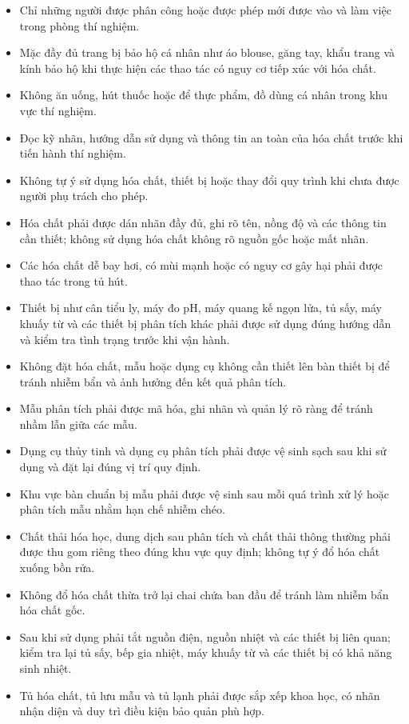 \begin{itemize}
  \item Chỉ những người được phân công hoặc được phép mới được vào và làm việc trong phòng thí nghiệm.
  \item Mặc đầy đủ trang bị bảo hộ cá nhân như áo blouse, găng tay, khẩu trang và kính bảo hộ khi thực hiện các thao tác có nguy cơ tiếp xúc với hóa chất.
  \item Không ăn uống, hút thuốc hoặc để thực phẩm, đồ dùng cá nhân trong khu vực thí nghiệm.
  \item Đọc kỹ nhãn, hướng dẫn sử dụng và thông tin an toàn của hóa chất trước khi tiến hành thí nghiệm.
  \item Không tự ý sử dụng hóa chất, thiết bị hoặc thay đổi quy trình khi chưa được người phụ trách cho phép.
  \item Hóa chất phải được dán nhãn đầy đủ, ghi rõ tên, nồng độ và các thông tin cần thiết; không sử dụng hóa chất không rõ nguồn gốc hoặc mất nhãn.
  \item Các hóa chất dễ bay hơi, có mùi mạnh hoặc có nguy cơ gây hại phải được thao tác trong tủ hút.
  \item Thiết bị như cân tiểu ly, máy đo pH, máy quang kế ngọn lửa, tủ sấy, máy khuấy từ và các thiết bị phân tích khác phải được sử dụng đúng hướng dẫn và kiểm tra tình trạng trước khi vận hành.
  \item Không đặt hóa chất, mẫu hoặc dụng cụ không cần thiết lên bàn thiết bị để tránh nhiễm bẩn và ảnh hưởng đến kết quả phân tích.
  \item Mẫu phân tích phải được mã hóa, ghi nhãn và quản lý rõ ràng để tránh nhầm lẫn giữa các mẫu.
  \item Dụng cụ thủy tinh và dụng cụ phân tích phải được vệ sinh sạch sau khi sử dụng và đặt lại đúng vị trí quy định.
  \item Khu vực bàn chuẩn bị mẫu phải được vệ sinh sau mỗi quá trình xử lý hoặc phân tích mẫu nhằm hạn chế nhiễm chéo.
  \item Chất thải hóa học, dung dịch sau phân tích và chất thải thông thường phải được thu gom riêng theo đúng khu vực quy định; không tự ý đổ hóa chất xuống bồn rửa.
  \item Không đổ hóa chất thừa trở lại chai chứa ban đầu để tránh làm nhiễm bẩn hóa chất gốc.
  \item Sau khi sử dụng phải tắt nguồn điện, nguồn nhiệt và các thiết bị liên quan; kiểm tra lại tủ sấy, bếp gia nhiệt, máy khuấy từ và các thiết bị có khả năng sinh nhiệt.
  \item Tủ hóa chất, tủ lưu mẫu và tủ lạnh phải được sắp xếp khoa học, có nhãn nhận diện và duy trì điều kiện bảo quản phù hợp.

\end{itemize}
